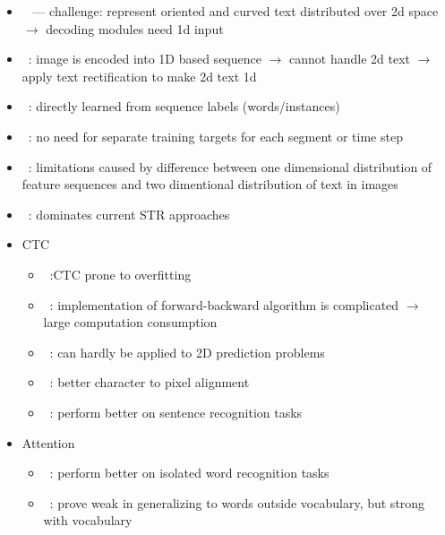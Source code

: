 \begin{itemize}
\begin{itemize}
            \item~\cite{long_scene_2021} --- challenge: represent oriented and curved text
                distributed over 2d space $\rightarrow$ decoding modules need 1d input
            \item~\cite{cheng_aon_2018}: image is encoded into 1D based sequence
                $\rightarrow$ cannot handle 2d text
                $\rightarrow$ apply text rectification to make 2d text 1d
            \item~\cite{shi_end--end_2017}: directly learned from sequence labels (words/instances)
            \item~\cite{xie_aggregation_2019}: no need for separate training targets for each segment
                or time step
            \item~\cite{liao_scene_2018}: limitations caused by difference between one dimensional
                distribution of feature sequences and two dimentional distribution of text in
                images
            \item~\cite{liao_scene_2018}: dominates current \ac{STR} approaches
            \item CTC
                \begin{itemize}
                    \item~\cite{chen_text_2021}:CTC prone to overfitting
                    \item~\cite{xie_aggregation_2019}: implementation of forward-backward algorithm
                        is complicated $\rightarrow$ large computation consumption
                    \item~\cite{cheng_focusing_2017,xie_aggregation_2019}: can hardly be applied
                        to 2D prediction problems
                    \item~\cite{long_scene_2021}: better character to pixel alignment
                    \item~\cite{cong_comparative_2019}: perform better on sentence recognition tasks
                \end{itemize}
            \item Attention
                \begin{itemize}
                    \item~\cite{cong_comparative_2019}: perform better on isolated word recognition
                        tasks
                    \item~\cite{wan_vocabulary_2020}: prove weak in generalizing to words
                        outside vocabulary, but strong with vocabulary

\end{itemize}
\end{itemize}
\end{itemize}
